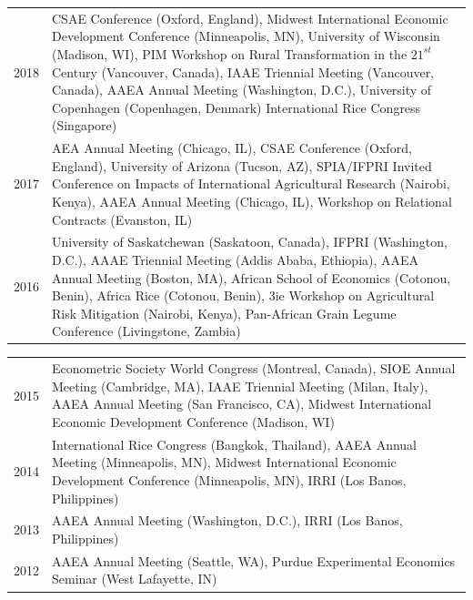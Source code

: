 \documentclass[letterpaper]{article}
\renewenvironment{itemize}{
  \begin{list}
  	{}{
    \setlength{\leftmargin}{1.5em}
    \setlength{\itemsep}{-.5em}
  }
}{
  \end{list}
}
\begin{document}
\begin{itemize}
\begin{tabular}{lp{.92\linewidth}}
	2018	& CSAE Conference (Oxford, England), Midwest International Economic Development Conference (Minneapolis, MN), University of Wisconsin (Madison, WI), PIM Workshop on Rural Transformation in the $21^{st}$ Century (Vancouver, Canada), IAAE Triennial Meeting (Vancouver, Canada), AAEA Annual Meeting (Washington, D.C.), University of Copenhagen (Copenhagen, Denmark) International Rice Congress (Singapore) \\
	2017	& AEA Annual Meeting (Chicago, IL), CSAE Conference (Oxford, England), University of Arizona (Tucson, AZ), SPIA/IFPRI Invited Conference on Impacts of International Agricultural Research (Nairobi, Kenya), AAEA Annual Meeting (Chicago, IL), Workshop on Relational Contracts (Evanston, IL) \\
	2016 	& University of Saskatchewan (Saskatoon, Canada), IFPRI (Washington, D.C.), AAAE Triennial Meeting (Addis Ababa, Ethiopia), AAEA Annual Meeting (Boston, MA), African School of Economics (Cotonou, Benin), Africa Rice (Cotonou, Benin), 3ie Workshop on Agricultural Risk Mitigation (Nairobi, Kenya), Pan-African Grain Legume Conference (Livingstone, Zambia) \\	 \end{tabular}
\begin{tabular}{lp{.92\linewidth}}
	2015 	& Econometric Society World Congress (Montreal, Canada), SIOE Annual Meeting (Cambridge, MA), IAAE Triennial Meeting (Milan, Italy), AAEA Annual Meeting (San Francisco, CA), Midwest International Economic Development Conference (Madison, WI) \\
	2014 	& International Rice Congress (Bangkok, Thailand), AAEA Annual Meeting (Minneapolis, MN), Midwest International Economic Development Conference (Minneapolis, MN), IRRI (Los Banos, Philippines) \\ 
	2013	& AAEA Annual Meeting (Washington, D.C.), IRRI (Los Banos, Philippines) \\
	2012 	& AAEA Annual Meeting (Seattle, WA), Purdue Experimental Economics Seminar (West Lafayette, IN) \\
	\end{tabular}
\end{itemize}
\end{document}
